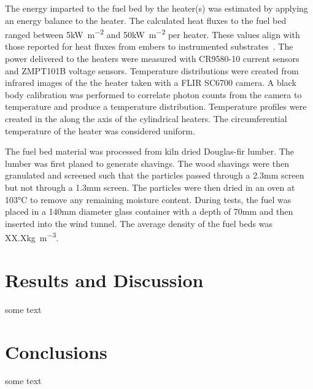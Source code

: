     The energy imparted to the fuel bed by the heater(s) was estimated by applying an energy balance to the heater. The calculated heat fluxes to the fuel bed ranged between 5\si{\kilo\watt\per\square\meter} and 50\si{\kilo\watt\per\square\meter} per heater. These values align with those reported for heat fluxes from embers to instrumented substrates~\cite{Tao2020, Hernandez2018}. The power delivered to the heaters were measured with CR9580-10 current sensors and ZMPT101B voltage sensors. Temperature distributions were created from infrared images of the the heater taken with a FLIR SC6700 camera. A black body calibration was performed to correlate photon counts from the camera to temperature and produce a temperature distribution. Temperature profiles were created in the along the axis of the cylindrical heaters. The circumferential temperature of the heater was considered uniform. 
    
    The fuel bed material was processed from kiln dried Douglas-fir lumber. The lumber was first planed to generate shavings. The wood shavings were then granulated and screened such that the particles passed through a 2.3\si{\milli\meter} screen but not through a 1.3\si{\milli\meter} screen. The particles were then dried in an oven at 103\si{\celsius} to remove any remaining moisture content. During tests, the fuel was placed in a 140\si{\milli\meter} diameter glass container with a depth of 70\si{\milli\meter} and then inserted into the wind tunnel. The average density of the fuel beds was XX.X\si{\kilo\gram\per\cubic\meter}.
    
    

\section{Results and Discussion}
    some text
\section{Conclusions}
    some text